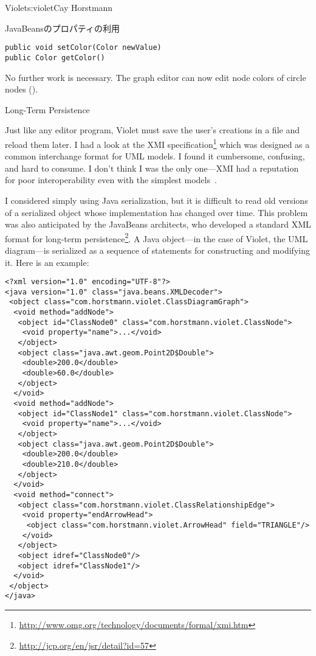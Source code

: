 \begin{aosachapter}{Violet}{s:violet}{Cay Horstmann}
\begin{aosasect1}{JavaBeansのプロパティの利用}
\begin{verbatim}
public void setColor(Color newValue)
public Color getColor()
\end{verbatim}

\noindent No further work is necessary. The graph editor can now edit node
colors of circle nodes ().


\end{aosasect1}

\begin{aosasect1}{Long-Term Persistence}

Just like any editor program, Violet must save the user's creations in
a file and reload them later. I had a look at the XMI
specification\footnote{\url{http://www.omg.org/technology/documents/formal/xmi.htm}}
which was designed as a common interchange format for UML models. I
found it cumbersome, confusing, and hard to consume. I don't think I
was the only one---XMI had a reputation for poor interoperability even
with the simplest models~\cite{bib:persson:osstools}.

I considered simply using Java serialization, but it is difficult to
read old versions of a serialized object whose implementation has
changed over time.  This problem was also anticipated by the JavaBeans
architects, who developed a standard XML format for long-term
persistence\footnote{\url{http://jcp.org/en/jsr/detail?id=57}}.  A
Java object---in the case of Violet, the UML diagram---is serialized
as a sequence of statements for constructing and modifying it. Here is
an example:

\begin{verbatim}
<?xml version="1.0" encoding="UTF-8"?>
<java version="1.0" class="java.beans.XMLDecoder">
 <object class="com.horstmann.violet.ClassDiagramGraph"> 
  <void method="addNode"> 
   <object id="ClassNode0" class="com.horstmann.violet.ClassNode"> 
    <void property="name">...</void> 
   </object> 
   <object class="java.awt.geom.Point2D$Double"> 
    <double>200.0</double> 
    <double>60.0</double> 
   </object> 
  </void> 
  <void method="addNode"> 
   <object id="ClassNode1" class="com.horstmann.violet.ClassNode"> 
    <void property="name">...</void> 
   </object> 
   <object class="java.awt.geom.Point2D$Double"> 
    <double>200.0</double> 
    <double>210.0</double> 
   </object> 
  </void> 
  <void method="connect"> 
   <object class="com.horstmann.violet.ClassRelationshipEdge"> 
    <void property="endArrowHead"> 
     <object class="com.horstmann.violet.ArrowHead" field="TRIANGLE"/> 
    </void> 
   </object> 
   <object idref="ClassNode0"/> 
   <object idref="ClassNode1"/> 
  </void> 
 </object> 
</java>
\end{verbatim}


\end{aosasect1}
\end{aosachapter}
